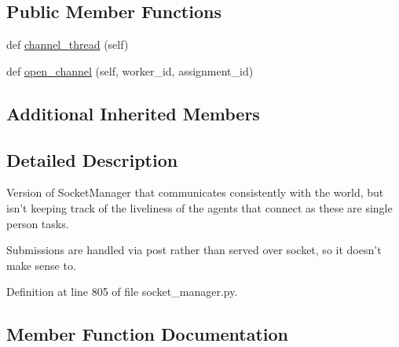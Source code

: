 \subsection*{Public Member Functions}
\begin{DoxyCompactItemize}
\item 
def \hyperlink{classparlai_1_1mturk_1_1core_1_1socket__manager_1_1StaticSocketManager_ac141271b1df6f50a5bfee040d7904696}{channel\+\_\+thread} (self)
\item 
def \hyperlink{classparlai_1_1mturk_1_1core_1_1socket__manager_1_1StaticSocketManager_a4672bc8a07f4ae122338ceb3a59cd54a}{open\+\_\+channel} (self, worker\+\_\+id, assignment\+\_\+id)
\end{DoxyCompactItemize}
\subsection*{Additional Inherited Members}


\subsection{Detailed Description}
\begin{DoxyVerb}Version of SocketManager that communicates consistently with the world, but isn't
keeping track of the liveliness of the agents that connect as these are single
person tasks.

Submissions are handled via post rather than served over socket, so it doesn't make
sense to.
\end{DoxyVerb}
 

Definition at line 805 of file socket\+\_\+manager.\+py.



\subsection{Member Function Documentation}
\mbox{\label{classparlai_1_1mturk_1_1core_1_1socket__manager_1_1StaticSocketManager_ac141271b1df6f50a5bfee040d7904696}} 
